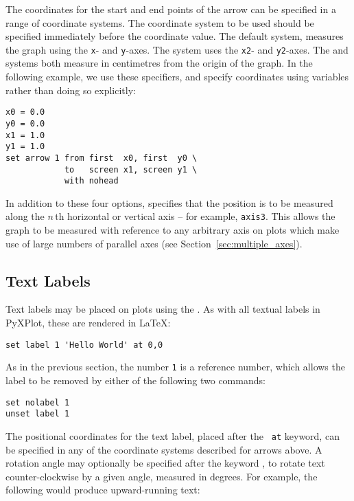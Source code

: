 The coordinates for the start and end points of the arrow can be specified in a
range of coordinate systems. The coordinate system to be used should be
specified immediately before the coordinate value. The default system,
 measures the graph using the {\tt x}- and {\tt y}-axes. The
 system uses the {\tt x2}- and {\tt y2}-axes. The
 and  systems both measure in centimetres from the
origin of the graph. In the following example, we use these specifiers, and
specify coordinates using variables rather than doing so explicitly:

\begin{verbatim}
x0 = 0.0
y0 = 0.0
x1 = 1.0
y1 = 1.0
set arrow 1 from first  x0, first  y0 \
            to   screen x1, screen y1 \
            with nohead
\end{verbatim}

In addition to these four options,  specifies that the
position is to be measured along the $n\,$th horizontal or vertical axis -- for
example, {\tt axis3}.\indcmd{set arrow} This allows the graph to be measured
with reference to any arbitrary axis on plots which make use of large numbers
of parallel axes (see Section~\ref{sec:multiple_axes}).

\subsection{Text Labels}

Text labels may be placed on plots using the . As with all
textual labels in PyXPlot, these are rendered in \LaTeX:

\begin{verbatim}
set label 1 'Hello World' at 0,0
\end{verbatim}

As in the previous section, the number {\tt 1} is a reference number, which
allows the label to be removed by either of the following two commands:

\begin{verbatim}
set nolabel 1
unset label 1
\end{verbatim}

\noindent The positional coordinates for the text label, placed after the {\tt
at} keyword, can be specified in any of the coordinate systems described for
arrows above. A rotation angle may optionally be specified after the keyword
\indkeyt{rotate}, to rotate text counter-clockwise by a given angle, measured
in degrees. For example, the following would produce upward-running text:

